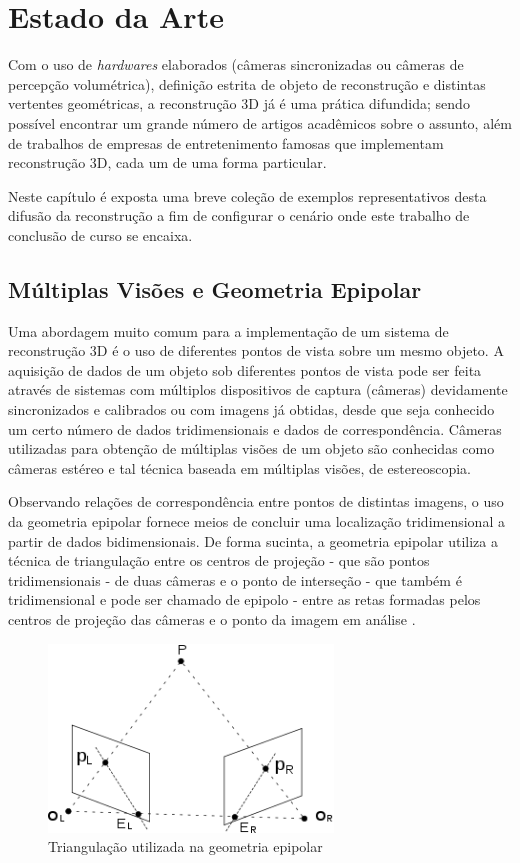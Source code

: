 \chapter{Estado da Arte}

	Com o uso de \textit{hardwares} elaborados (câmeras sincronizadas ou câmeras de percepção volumétrica), definição estrita de objeto de reconstrução e distintas vertentes geométricas, a reconstrução 3D já é uma prática difundida; sendo possível encontrar um grande número de artigos acadêmicos sobre o assunto, além de trabalhos de empresas de entretenimento famosas que implementam reconstrução 3D, cada um de uma forma particular.

	Neste capítulo é exposta uma breve coleção de exemplos representativos desta difusão da reconstrução a fim de configurar o cenário onde este trabalho de conclusão de curso se encaixa.
	
	\section{Múltiplas Visões e Geometria Epipolar}
	
	Uma abordagem muito comum para a implementação de um sistema de reconstrução 3D é o uso de diferentes pontos de vista sobre um mesmo objeto. A aquisição de dados de um objeto sob diferentes pontos de vista pode ser feita através de sistemas com múltiplos dispositivos de captura (câmeras) devidamente sincronizados e calibrados ou com imagens já obtidas, desde que seja conhecido um certo número de dados tridimensionais e dados de correspondência. Câmeras utilizadas para obtenção de múltiplas visões de um objeto são conhecidas como câmeras estéreo e tal técnica baseada em múltiplas visões, de estereoscopia.
	
	Observando relações de correspondência entre pontos de distintas imagens, o uso da geometria epipolar fornece meios de concluir uma localização tridimensional a partir de dados bidimensionais. De forma sucinta, a geometria epipolar utiliza a técnica de triangulação entre os centros de projeção - que são pontos tridimensionais - de duas câmeras e o ponto de interseção - que também é tridimensional e pode ser chamado de epipolo - entre as retas formadas pelos centros de projeção das câmeras e o ponto da imagem em análise \cite{animation}.
	
	\begin{figure}[!htb]
		\centering
		\includegraphics[height=5cm]{imagens/geometriaEpipolar.png}
		\caption{Triangulação utilizada na geometria epipolar}
		\label{fotoGeometriaEpipolar}
	\end{figure}
	
